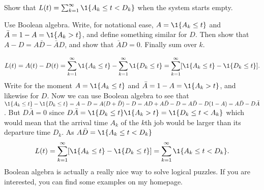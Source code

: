 \begin{exercise}\label{ex:l-151} 
 Show  that $\L(t) = \sum_{k=1}^\infty \1{A_k \leq t < D_k}$ when the system starts empty.
\begin{hint}
 Use Boolean algebra.
 Write, for notational ease, $A=\1{A_k \leq t}$ and $\bar A = 1- A = \1{A_k > t}$, and define something similar for $D$.
 Then show that $A - D = A \bar D - \bar A D$, and show that $\bar A D =0$.
 Finally sum over $k$.
\end{hint}
\begin{solution}
 \begin{equation*}
 \L(t)
= A(t) - D(t) = \sum_{k=1}^\infty \1{A_k \leq t} - \sum_{k=1}^\infty \1{D_k \leq t} 
= \sum_{k=1}^\infty [\1{A_k \leq t} - \1{D_k \leq t}].
 \end{equation*}
 Write for the moment $A=\1{A_k \leq t}$ and
 $\bar A = 1- A = \1{A_k > t}$, and likewise for $D$. Now we can use
 Boolean algebra to see that
 $\1{A_k \leq t} - \1{D_k \leq t} = A-D = A(D+\bar D) -D = AD +
 A\bar D - D = A\bar D - D(1-A) = A\bar D - D \bar A$.
 But $D \bar A = 0$ since
 $D \bar A = \1{D_k \leq t} \1{A_k > t} = \1{D_k \leq t < A_k}$
 which would mean that the arrival time $A_k$ of the $k$th job would
 be larger than its departure time $D_k$. As $A \bar D = \1{A_k \leq t < D_k}$
 \begin{equation*}
 \L(t)
= \sum_{k=1}^\infty [\1{A_k \leq t} - \1{D_k \leq t}] 
= \sum_{k=1}^\infty \1{A_k \leq t < D_k}.
 \end{equation*}
 Boolean algebra is actually a really nice way to solve logical puzzles.
 If you are interested, you can find some examples on my homepage.
\end{solution}
\end{exercise}

